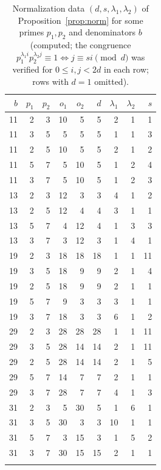 \begin{longtable}{@{}rrr rr r rr r@{}}
\toprule $b$ & $p_1$ & $p_2$ & $o_1$ & $o_2$ & $d$ & $\lambda_1$ & $\lambda_2$ & $s$\\\midrule\endhead
11 & 2 & 3 & 10 & 5 & 5 & 2 & 1 & 1\\
11 & 3 & 5 & 5 & 5 & 5 & 1 & 1 & 3\\
11 & 2 & 5 & 10 & 5 & 5 & 2 & 1 & 2\\
11 & 5 & 7 & 5 & 10 & 5 & 1 & 2 & 4\\
11 & 3 & 7 & 5 & 10 & 5 & 1 & 2 & 3\\
13 & 2 & 3 & 12 & 3 & 3 & 4 & 1 & 2\\
13 & 2 & 5 & 12 & 4 & 4 & 3 & 1 & 1\\
13 & 5 & 7 & 4 & 12 & 4 & 1 & 3 & 3\\
13 & 3 & 7 & 3 & 12 & 3 & 1 & 4 & 1\\
19 & 2 & 3 & 18 & 18 & 18 & 1 & 1 & 11\\
19 & 3 & 5 & 18 & 9 & 9 & 2 & 1 & 4\\
19 & 2 & 5 & 18 & 9 & 9 & 2 & 1 & 1\\
19 & 5 & 7 & 9 & 3 & 3 & 3 & 1 & 1\\
19 & 3 & 7 & 18 & 3 & 3 & 6 & 1 & 2\\
29 & 2 & 3 & 28 & 28 & 28 & 1 & 1 & 11\\
29 & 3 & 5 & 28 & 14 & 14 & 2 & 1 & 11\\
29 & 2 & 5 & 28 & 14 & 14 & 2 & 1 & 5\\
29 & 5 & 7 & 14 & 7 & 7 & 2 & 1 & 1\\
29 & 3 & 7 & 28 & 7 & 7 & 4 & 1 & 3\\
31 & 2 & 3 & 5 & 30 & 5 & 1 & 6 & 1\\
31 & 3 & 5 & 30 & 3 & 3 & 10 & 1 & 1\\
31 & 5 & 7 & 3 & 15 & 3 & 1 & 5 & 2\\
31 & 3 & 7 & 30 & 15 & 15 & 2 & 1 & 1\\
\bottomrule\caption{Normalization data $(d,s,\lambda_1,\lambda_2)$ of Proposition~\ref{prop:norm} for some primes $p_1,p_2$ and denominators $b$ (computed; the congruence $p_1^{\lambda_1i}p_2^{\lambda_2j}\equiv1\iff j\equiv si\pmod d$ was verified for $0\le i,j<2d$ in each row; rows with $d=1$ omitted).}\label{tab:param}\end{longtable}